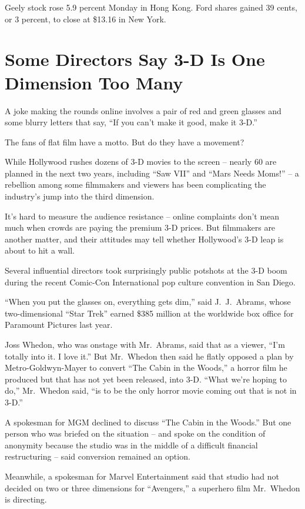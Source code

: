 ﻿\documentclass[12pt]{article}
\begin{document}
Geely stock rose 5.9 percent Monday in Hong Kong. Ford shares gained 39 cents, or 3 percent, to
close at \$13.16 in New York.

\section{Some Directors Say 3-D Is One Dimension Too Many}

\lettrine{A}{} joke making the rounds online involves a pair of red and
green glasses and some blurry letters that say, ``If you can't make it good, make it 3-D.''

The fans of flat film have a motto. But do they have a movement?

While Hollywood rushes dozens of 3-D movies to the screen -- nearly 60 are planned in the next two
years, including ``Saw VII'' and ``Mars Needs Moms!'' -- a rebellion among some filmmakers and
viewers has been complicating the industry's jump into the third dimension.

It's hard to measure the audience resistance -- online complaints don't mean much when crowds are
paying the premium 3-D prices. But filmmakers are another matter, and their attitudes may tell
whether Hollywood's 3-D leap is about to hit a wall.

Several influential directors took surprisingly public potshots at the 3-D boom during the recent
Comic-Con International pop culture convention in San Diego.

``When you put the glasses on, everything gets dim,'' said J.~J.~Abrams, whose two-dimensional
``Star Trek'' earned \$385 million at the worldwide box office for Paramount Pictures last year.

Joss Whedon, who was onstage with Mr.~Abrams, said that as a viewer, ``I'm totally into it. I love
it.'' But Mr.~Whedon then said he flatly opposed a plan by Metro-Goldwyn-Mayer to convert ``The
Cabin in the Woods,'' a horror film he produced but that has not yet been released, into 3-D. ``What
we're hoping to do,'' Mr.~Whedon said, ``is to be the only horror movie coming out that is not in
3-D.''

A spokesman for MGM declined to discuss ``The Cabin in the Woods.'' But one person who was briefed
on the situation -- and spoke on the condition of anonymity because the studio was in the middle of
a difficult financial restructuring -- said conversion remained an option.

Meanwhile, a spokesman for Marvel Entertainment said that studio had not decided on two or three
dimensions for ``Avengers,'' a superhero film Mr.~Whedon is directing.
\end{document}
